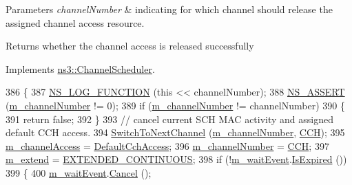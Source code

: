 \begin{DoxyParams}{Parameters}
{\em channel\+Number} & indicating for which channel should release the assigned channel access resource. \\
\hline
\end{DoxyParams}
\begin{DoxyReturn}{Returns}
whether the channel access is released successfully 
\end{DoxyReturn}


Implements \hyperlink{classns3_1_1ChannelScheduler_acf0f97227d2908378394504bc8f615e9}{ns3\+::\+Channel\+Scheduler}.


\begin{DoxyCode}
386 \{
387   \hyperlink{log-macros-disabled_8h_a90b90d5bad1f39cb1b64923ea94c0761}{NS\_LOG\_FUNCTION} (\textcolor{keyword}{this} << channelNumber);
388   \hyperlink{assert_8h_a6dccdb0de9b252f60088ce281c49d052}{NS\_ASSERT} (\hyperlink{classns3_1_1DefaultChannelScheduler_ade2b5b6a517ae8cfaf6c476c422d0d41}{m\_channelNumber} != 0);
389   \textcolor{keywordflow}{if} (\hyperlink{classns3_1_1DefaultChannelScheduler_ade2b5b6a517ae8cfaf6c476c422d0d41}{m\_channelNumber} != channelNumber)
390     \{
391       \textcolor{keywordflow}{return} \textcolor{keyword}{false};
392     \}
393   \textcolor{comment}{// cancel  current SCH MAC activity and assigned default CCH access.}
394   \hyperlink{classns3_1_1DefaultChannelScheduler_a661fb5bfff90527fa4be59820ccf8bdf}{SwitchToNextChannel} (\hyperlink{classns3_1_1DefaultChannelScheduler_ade2b5b6a517ae8cfaf6c476c422d0d41}{m\_channelNumber}, \hyperlink{channel-manager_8h_a52d2f169cde2f6abe66ecc83f0d7ad80}{CCH});
395   \hyperlink{classns3_1_1DefaultChannelScheduler_a1316c42b27cfd480a0a2bf4f949f0402}{m\_channelAccess} = \hyperlink{namespacens3_a877f2f8d3767cc34993bce0739179781af80a046b555961b3327692b8e86a0d9e}{DefaultCchAccess};
396   \hyperlink{classns3_1_1DefaultChannelScheduler_ade2b5b6a517ae8cfaf6c476c422d0d41}{m\_channelNumber} = \hyperlink{channel-manager_8h_a52d2f169cde2f6abe66ecc83f0d7ad80}{CCH};
397   \hyperlink{classns3_1_1DefaultChannelScheduler_a3a9b84c45c27a713bb2e9842a0b69992}{m\_extend} = \hyperlink{channel-scheduler_8h_a51fe3e802b9451e2893d55d591047fc1}{EXTENDED\_CONTINUOUS};
398   \textcolor{keywordflow}{if} (!\hyperlink{classns3_1_1DefaultChannelScheduler_a82768fbbb4fc84cdffefb0a2b1595ace}{m\_waitEvent}.\hyperlink{classns3_1_1EventId_a5c30c92e7c1c34b4e8505cc07ed71b02}{IsExpired} ())
399     \{
400       \hyperlink{classns3_1_1DefaultChannelScheduler_a82768fbbb4fc84cdffefb0a2b1595ace}{m\_waitEvent}.\hyperlink{classns3_1_1EventId_a993ae94e48e014e1afd47edb16db7a11}{Cancel} ();

\end{DoxyCode}

